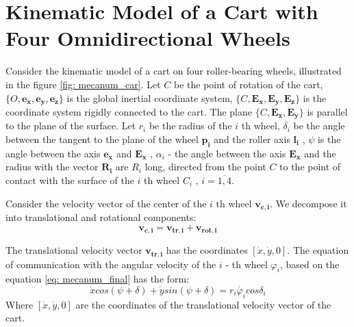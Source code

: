 \documentclass[oneside,final,14pt]{extreport}
\newcommand{\cmmnt}[1]{\ignorespaces}
\newcommand{\bs}{\boldsymbol}
\begin{document}
\chapter{Kinematic Model of a Cart with Four Omnidirectional Wheels}
Consider the kinematic model of a cart on four roller-bearing wheels, illustrated in the figure \ref{fig: mecanum_car}. Let $ C $ be the point of rotation of the cart, $ \{O, \bs{e_{x}}, \bs{e_{y}}, \bs{e_{z}} \} $ is the global inertial coordinate system, $ \{C, \bs{E_{x}}, \bs{E_{y}}, \bs{E_{z}} \} $ is the coordinate system rigidly connected to the cart. The plane $ \{C, \bs{E_{x}}, \bs{E_{y}} \} $ is parallel to the plane of the surface. Let $ r_{i} $ be the radius of the $ i $ th wheel, $ \delta_{i} $ be the angle between the tangent to the plane of the wheel $ \bs{p_{i}} $ and the roller axis $ \bs{l_{i }} $ \cmmnt{, $ \delta_{i} = \widehat{p_{i} l_{i}} $}, $ \psi $ is the angle between the axis $ \bs{e_{x}} $ and $ \bs{E_{x}} $ \cmmnt{, $ \psi $ = $ \widehat{e_{x} E{x}} $}, $ \alpha_{i} $ - the angle between the axis $ \bs{E_{ x}} $ and the radius with the vector $ \bs{R_{i}} $ are $ R_{i} $ long, directed from the point $ C $ to the point of contact with the surface of the $ i $ th wheel $ C_{i} $ \cmmnt{, $ \alpha_{i} = \widehat{E_{x} \overrightarrow{C C_{i}}} $}, $ i = \overline{1,4} $.

\begin{figure} [H]
\end{figure}

Consider the velocity vector of the center of the $ i $ th wheel $ \bs{v_{c, i}} $. We decompose it into translational and rotational components:
\begin{equation}
\label{eq: mec_wheel_v_decomp}
\bs{v_{c, i}}
=
\bs{v_{tr, i}}
+
\bs{v_{rot, i}}
\end{equation}

The translational velocity vector $ \bs{v_{tr, i}} $ has the coordinates $ [\dot{x}, \dot{y}, 0] $. The equation of communication with the angular velocity of the $ i $ - th wheel $ \varphi_{i} $, based on the equation \ref{eq: mecanum_final} has the form:
\begin{equation}
\dot{x}
cos (\psi + \delta)
+
\dot{y}
sin (\psi + \delta)
=
r_{i} \dot{\varphi_{i}}
cos \delta_{i}
\end{equation}
Where $ [\dot{x}, \dot{y}, 0] $ are the coordinates of the translational velocity vector of the cart.
\end{document}

